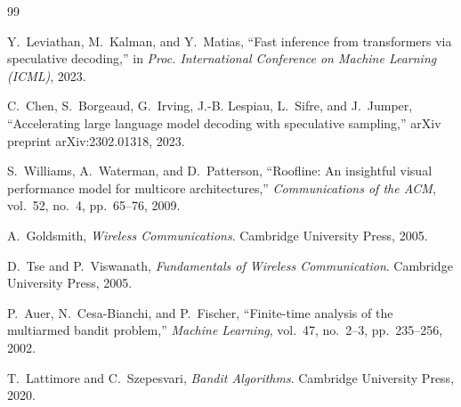 \documentclass[11pt,a4paper]{ctexart}
\begin{document}
\begin{thebibliography}{99}

Y.~Leviathan, M.~Kalman, and Y.~Matias,
``Fast inference from transformers via speculative decoding,''
in \emph{Proc. International Conference on Machine Learning (ICML)}, 2023.

C.~Chen, S.~Borgeaud, G.~Irving, J.-B. Lespiau, L.~Sifre, and J.~Jumper,
``Accelerating large language model decoding with speculative sampling,''
arXiv preprint arXiv:2302.01318, 2023.

S.~Williams, A.~Waterman, and D.~Patterson,
``Roofline: An insightful visual performance model for multicore architectures,''
\emph{Communications of the ACM}, vol.~52, no.~4, pp.~65--76, 2009.

A.~Goldsmith,
\emph{Wireless Communications}.
Cambridge University Press, 2005.

D.~Tse and P.~Viswanath,
\emph{Fundamentals of Wireless Communication}.
Cambridge University Press, 2005.

P.~Auer, N.~Cesa-Bianchi, and P.~Fischer,
``Finite-time analysis of the multiarmed bandit problem,''
\emph{Machine Learning}, vol.~47, no.~2--3, pp.~235--256, 2002.

T.~Lattimore and C.~Szepesvari,
\emph{Bandit Algorithms}.
Cambridge University Press, 2020.

\end{thebibliography}
\end{document}
